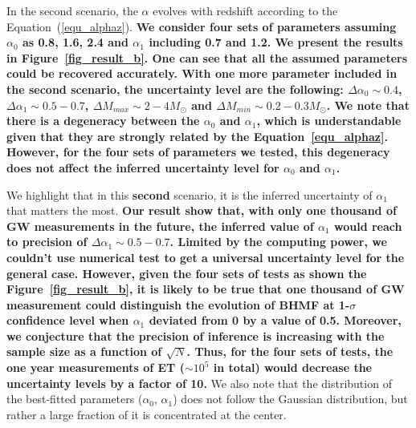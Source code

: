 \documentclass[twocolumn]{aastex62}
\newcommand{\blue}[1]{{\bf #1}}
\begin{document}
In the second scenario, the $\alpha$ evolves with redshift according to the Equation~(\ref{equ_alphaz}). \blue{We consider four sets of parameters assuming $\alpha_0$ as  0.8, 1.6, 2.4 and $\alpha_1$ including 0.7 and 1.2. We present the results in Figure~\ref{fig_result_b}. One can see that all the assumed parameters could be recovered accurately. With one more parameter included in the second scenario, the uncertainty level are the following: $\Delta\alpha_0\sim0.4$, $\Delta\alpha_1\sim0.5-0.7$, $\Delta M_{max}\sim2-4M_{\odot}$ and $\Delta M_{min}\sim0.2-0.3M_{\odot}$. We note that there is a degeneracy between the $\alpha_0$ and $\alpha_1$, which is understandable given that they are strongly related by the Equation~\ref{equ_alphaz}. However, for the four sets of parameters we tested, this degeneracy does not affect the inferred uncertainty level for $\alpha_0$ and $\alpha_1$.
}

We highlight that in this \blue{second} scenario, it is the inferred uncertainty of $\alpha_1$ that matters the most. \blue{Our result show that, with only one thousand of GW measurements in the future, the inferred value of $\alpha_1$ would reach to precision of $\Delta\alpha_1\sim0.5-0.7$. Limited by the computing power, we couldn't use numerical test to get a universal uncertainty level for the general case. However, given the four sets of tests as shown the Figure~\ref{fig_result_b}, it is likely to be true that one thousand of GW measurement could distinguish the evolution of BHMF at 1-$\sigma$ confidence level when $\alpha_1$ deviated from 0 by a value of 0.5. 
Moreover, we conjecture that the precision of inference is increasing with the sample size as a function of $\sqrt{N}$. Thus, for the four sets of tests, the one year measurements of ET ($\sim10^5$ in total) would decrease the uncertainty levels by a factor of 10.}
We also note that the distribution of the best-fitted parameters ($\alpha_0$, $\alpha_1$) does not follow the Gaussian distribution, but rather a large fraction of it is concentrated at the center.
\end{document}
